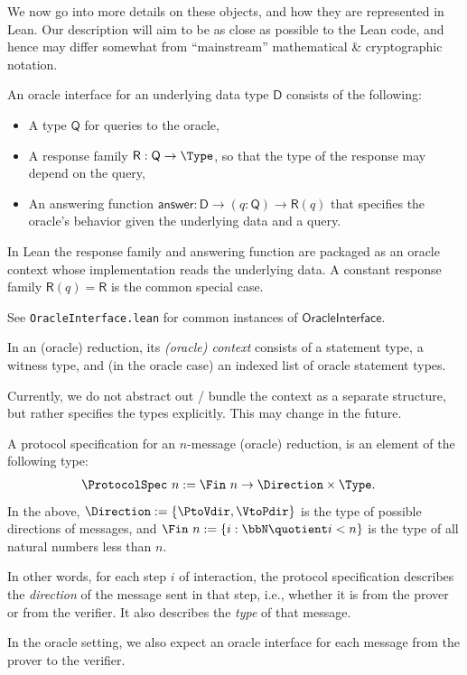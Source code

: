 We now go into more details on these objects, and how they are represented in Lean. Our description will aim to be as close as possible to the Lean code, and hence may differ somewhat from ``mainstream'' mathematical \& cryptographic notation.

\begin{definition}
    \label{def:oracle_interface}
    An oracle interface for an underlying data type \(\mathsf{D}\) consists of the following:
    \begin{itemize}
        \item A type \(\mathsf{Q}\) for queries to the oracle,
        \item A response family \(\mathsf{R} : \mathsf{Q} \to \Type\), so that the type of the
        response may depend on the query,
        \item An answering function \(\mathsf{answer} : \mathsf{D} \to (q : \mathsf{Q}) \to
        \mathsf{R}(q)\) that specifies the oracle's behavior given the underlying data and a query.
    \end{itemize}
    In Lean the response family and answering function are packaged as an oracle context whose
    implementation reads the underlying data. A constant response family \(\mathsf{R}(q) = \mathsf{R}\)
    is the common special case.
    \leanok
\end{definition}

See \texttt{OracleInterface.lean} for common instances of \(\mathsf{OracleInterface}\).


\begin{definition}[Context]
    \label{def:context}
    In an (oracle) reduction, its \emph{(oracle) context} consists of a statement type, a witness
    type, and (in the oracle case) an indexed list of oracle statement types.

    Currently, we do not abstract out / bundle the context as a separate structure, but rather
    specifies the types explicitly. This may change in the future.
\end{definition}

\begin{definition}
    \label{def:protocol_spec}
    A protocol specification for an \(n\)-message (oracle) reduction, is an element of the following type:
    \begin{align*}
        \ProtocolSpec\ n &:= \Fin\ n \to \Direction \times \Type.
    \end{align*}
    In the above, \(\Direction := \{ \PtoVdir, \VtoPdir \}\) is the type of possible directions of messages, and \(\Fin\ n := \{ i : \bbN \quotient i < n \}\) is the type of all natural numbers less than \(n\).

    In other words, for each step \(i\) of interaction, the protocol specification describes the \emph{direction} of the message sent in that step, i.e., whether it is from the prover or from the verifier. It also describes the \emph{type} of that message.

    In the oracle setting, we also expect an oracle interface for each message from the prover to the verifier.
    \leanok
\end{definition}

